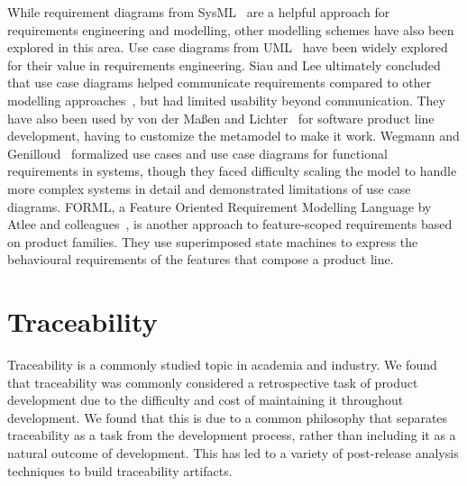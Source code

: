 While requirement diagrams from SysML~\cite{sysml2019omg} are a helpful approach for requirements engineering and modelling, other modelling schemes have also been explored in this area. Use case diagrams from UML~\cite{fowler2018uml} have been widely explored for their value in requirements engineering. Siau and Lee ultimately concluded that use case diagrams helped communicate requirements compared to other modelling approaches~\cite{siau2004use}, but had limited usability beyond communication. They have also been used by von der Ma{\ss}en and Lichter~\cite{von2002modeling} for software product line development, having to customize the metamodel to make it work. Wegmann and Genilloud~\cite{wegmann2000role} formalized use cases and use case diagrams for functional requirements in systems, though they faced difficulty scaling the model to handle more complex systems in detail and demonstrated limitations of use case diagrams. FORML, a Feature Oriented Requirement Modelling Language by Atlee and colleagues~\cite{Beidu2019, 6345799}, is another approach to feature-scoped requirements based on product families. They use superimposed state machines to express the behavioural requirements of the features that compose a product line.



\section{Traceability}

Traceability is a commonly studied topic in academia and industry. We found that traceability was commonly considered a retrospective task of product development due to the difficulty and cost of maintaining it throughout development. We found that this is due to a common philosophy that separates traceability as a task from the development process, rather than including it as a natural outcome of development. This has led to a variety of post-release analysis techniques to build traceability artifacts.

